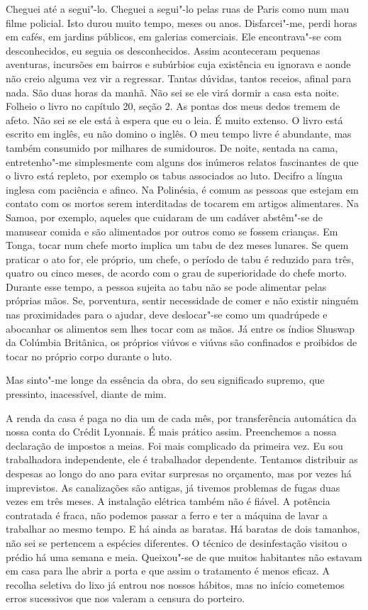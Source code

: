 Cheguei até a segui"-lo. Cheguei a segui"-lo pelas ruas de Paris como num
mau filme policial. Isto durou muito tempo, meses ou anos. Disfarcei"-me,
perdi horas em cafés, em jardins públicos, em galerias comerciais. Ele
encontrava"-se com desconhecidos, eu seguia os desconhecidos. Assim
aconteceram pequenas aventuras, incursões em bairros e subúrbios cuja existência
eu ignorava e aonde não creio alguma vez vir a regressar. Tantas
dúvidas, tantos receios, afinal para nada. São duas horas da manhã. Não
sei se ele virá dormir a casa esta noite. Folheio o livro no capítulo
20, seção 2. As pontas dos meus dedos tremem de afeto. Não sei se ele
está à espera que eu o leia. É muito extenso. O livro está escrito em
inglês, eu não domino o inglês. O meu tempo livre é abundante, mas
também consumido por milhares de sumidouros. De noite, sentada na cama,
entretenho"-me simplesmente com alguns dos inúmeros relatos fascinantes
de que o livro está repleto, por exemplo os tabus associados ao luto.
Decifro a língua inglesa com paciência e afinco. Na Polinésia, é comum
as pessoas que estejam em contato com os mortos serem interditadas de
tocarem em artigos alimentares. Na Samoa, por exemplo, aqueles que
cuidaram de um cadáver abstêm"-se de manusear comida e são alimentados
por outros como se fossem crianças. Em Tonga, tocar num chefe morto
implica um tabu de dez meses lunares. Se quem praticar o ato for, ele
próprio, um chefe, o período de tabu é reduzido para três, quatro ou
cinco meses, de acordo com o grau de superioridade do chefe morto.
Durante esse tempo, a pessoa sujeita ao tabu não se pode alimentar pelas
próprias mãos. Se, porventura, sentir necessidade de comer e não
existir ninguém nas proximidades para o ajudar, deve deslocar"-se como um
quadrúpede e abocanhar os alimentos sem lhes tocar com as mãos. Já entre
os índios Shuswap da Colúmbia Britânica, os próprios viúvos e viúvas são
confinados e proibidos de tocar no próprio corpo durante o luto.

Mas sinto"-me longe da essência da obra, do seu significado
supremo, que pressinto, inacessível, diante de mim.


A renda da casa é paga no dia um de cada mês, por transferência
automática da nossa conta do Crédit Lyonnais. É mais prático assim.
Preenchemos a nossa declaração de impostos a meias. Foi mais
complicado da primeira vez. Eu sou trabalhadora independente, ele é
trabalhador dependente. Tentamos distribuir as despesas ao longo do ano
para evitar surpresas no orçamento, mas por vezes há imprevistos. As
canalizações são antigas, já tivemos problemas de fugas duas vezes em
três meses. A instalação elétrica também não é fiável. A potência
contratada é fraca, não podemos passar a ferro e ter a máquina de lavar
a trabalhar ao mesmo tempo. E há ainda as baratas. Há baratas de dois
tamanhos, não sei se pertencem a espécies diferentes. O técnico de
desinfestação visitou o prédio há uma semana e meia. Queixou"-se de que
muitos habitantes não estavam em casa para lhe abrir a porta e que assim
o tratamento é menos eficaz. A recolha seletiva do lixo já entrou nos
nossos hábitos, mas no início cometemos erros sucessivos que nos valeram
a censura do porteiro.

